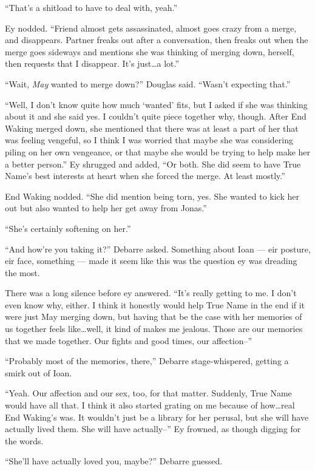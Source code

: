 ``That's a shitload to have to deal with, yeah.''

Ey nodded. ``Friend almost gets assassinated, almost goes crazy from a merge, and disappears. Partner freaks out after a conversation, then freaks out when the merge goes sideways and mentions she was thinking of merging down, herself, then requests that I disappear. It's just\ldots a lot.''

``Wait, \emph{May} wanted to merge down?'' Douglas said. ``Wasn't expecting that.''

``Well, I don't know quite how much `wanted' fits, but I asked if she was thinking about it and she said yes. I couldn't quite piece together why, though. After End Waking merged down, she mentioned that there was at least a part of her that was feeling vengeful, so I think I was worried that maybe she was considering piling on her own vengeance, or that maybe she would be trying to help make her a better person.'' Ey shrugged and added, ``Or both. She did seem to have True Name's best interests at heart when she forced the merge. At least mostly.''

End Waking nodded. ``She did mention being torn, yes. She wanted to kick her out but also wanted to help her get away from Jonas.''

``She's certainly softening on her.''

``And how're you taking it?'' Debarre asked. Something about Ioan — eir posture, eir face, something — made it seem like this was the question ey was dreading the most.

There was a long silence before ey answered. ``It's really getting to me. I don't even know why, either. I think it honestly would help True Name in the end if it were just May merging down, but having that be the case with her memories of us together feels like\ldots well, it kind of makes me jealous. Those are our memories that we made together. Our fights and good times, our affection--''

``Probably most of the memories, there,'' Debarre stage-whispered, getting a smirk out of Ioan.

``Yeah. Our affection and our sex, too, for that matter. Suddenly, True Name would have all that. I think it also started grating on me because of how\ldots real End Waking's was. It wouldn't just be a library for her perusal, but she will have actually lived them. She will have actually--'' Ey frowned, as though digging for the words.

``She'll have actually loved you, maybe?'' Debarre guessed.

